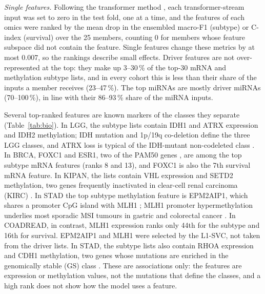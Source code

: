 \documentclass[conference]{IEEEtran}
\begin{document}
\emph{Single features.} Following the transformer method \cite{meng2026motcs}, each transformer-stream input was set to
zero in the test fold, one at a time, and the features of each omics were ranked by the mean drop in the ensembled
macro-F1 (subtype) or C-index (survival) over the 25 members, counting 0 for members whose feature subspace did not
contain the feature. Single features change these metrics by at most 0.007, so the rankings describe small effects.
Driver features are not over-represented at the top: they make up 3--30\,\% of the top-30 mRNA and methylation subtype
lists, and in every cohort this is less than their share of the inputs a member receives (23--47\,\%). The top miRNAs
are mostly driver miRNAs (70--100\,\%), in line with their 86--93\,\% share of the miRNA inputs.

Several top-ranked features are known markers of the classes they separate (Table~\ref{tab:bio}). In LGG, the subtype
lists contain IDH1 and ATRX expression and IDH2 methylation; IDH mutation and 1p/19q co-deletion define the three LGG
classes, and ATRX loss is typical of the IDH-mutant non-codeleted class \cite{tcga2015lgg}. In BRCA, FOXC1 and ESR1, two of the PAM50 genes \cite{parker2009pam50}, are among
the top subtype mRNA features (ranks 8 and 13), and FOXC1 is also the 7th survival mRNA feature. In KIPAN, the lists contain VHL
expression and SETD2 methylation, two genes frequently inactivated in clear-cell renal carcinoma (KIRC)
\cite{tcga2013kirc}. In STAD the top subtype methylation feature is EPM2AIP1, which shares a promoter CpG island with
MLH1 \cite{damaso2018mlh1}; MLH1 promoter hypermethylation underlies most sporadic MSI tumours in gastric and colorectal
cancer \cite{tcga2012crc,tcga2014stad}. In COADREAD, in contrast, MLH1 expression ranks only 44th for the subtype and
16th for survival. EPM2AIP1 and MLH1 were selected by the L1-SVC, not taken from the driver lists. In STAD, the subtype lists also contain RHOA expression and
CDH1 methylation, two genes whose mutations are enriched in the genomically stable (GS) class \cite{tcga2014stad}. These are
associations only: the features are expression or methylation values, not the mutations that define the classes, and a
high rank does not show how the model uses a feature.
\end{document}

